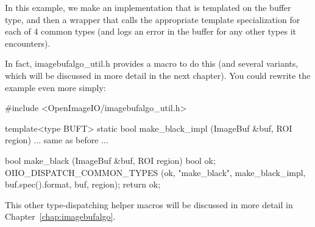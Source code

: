In this example, we make an implementation that is templated on
the buffer type, and then a wrapper that calls the appropriate
template specialization for each of 4 common types (and logs
an error in the buffer for any other types it encounters).

In fact, {\cf imagebufalgo_util.h} provides a macro to do this (and
several variants, which will be discussed in more detail in the next
chapter).  You could rewrite the example even more simply:

\begin{code}
#include <OpenImageIO/imagebufalgo_util.h>

template<type BUFT>
static bool make_black_impl (ImageBuf &buf, ROI region)
{
    ... same as before ...
}

bool make_black (ImageBuf &buf, ROI region)
{
    bool ok;
    OIIO_DISPATCH_COMMON_TYPES (ok, "make_black", make_black_impl,
                                 buf.spec().format, buf, region);
    return ok;
}
\end{code}

\noindent This other type-dispatching helper macros will be discussed in more
detail in Chapter~\ref{chap:imagebufalgo}.


\chapwidthend
